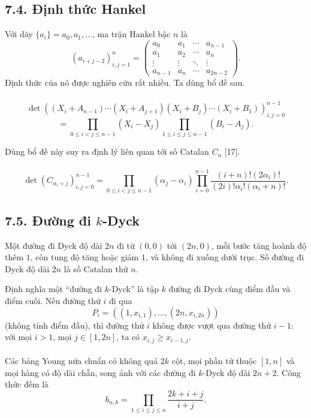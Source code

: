 \documentclass[11pt]{article}
\begin{document}
\subsection*{7.4. Định thức Hankel}

Với dãy \(\{a_i\}=a_0,a_1,\ldots\), ma trận Hankel bậc \(n\) là
\[
(a_{i+j-2})_{i,j=1}^n=
\begin{pmatrix}
a_0&a_1&\cdots&a_{n-1}\\
a_1&a_2&\cdots&a_n\\
\vdots&\vdots&\ddots&\vdots\\
a_{n-1}&a_n&\cdots&a_{2n-2}
\end{pmatrix}.
\]
Định thức của nó được nghiên cứu rất nhiều. Ta dùng bổ đề sau.

\paragraph{}
\[
\det\left(
(X_i+A_{n-1})\cdots(X_i+A_{j+1})
(X_i+B_j)\cdots(X_i+B_1)
\right)_{i,j=0}^{n-1}
\]
\[
=\prod_{0\le i<j\le n-1}(X_i-X_j)
\prod_{1\le i\le j\le n-1}(B_i-A_j).
\]

Dùng bổ đề này suy ra định lý liên quan tới số Catalan \(C_n\) [17].

\paragraph{}
\[
\det(C_{\alpha_i+j})_{i,j=0}^{n-1}
=
\prod_{0\le i<j\le n-1}(\alpha_j-\alpha_i)
\prod_{i=0}^{n-1}
\frac{(i+n)!(2\alpha_i)!}{(2i)!\alpha_i!(\alpha_i+n)!}.
\]

\subsection*{7.5. Đường đi \(k\)-Dyck}

Một đường đi Dyck độ dài \(2n\) đi từ \((0,0)\) tới \((2n,0)\), mỗi bước tăng
hoành độ thêm \(1\), còn tung độ tăng hoặc giảm \(1\), và không đi xuống dưới
trục. Số đường đi Dyck độ dài \(2n\) là số Catalan thứ \(n\).

Định nghĩa một ``đường đi \(k\)-Dyck'' là tập \(k\) đường đi Dyck cùng điểm
đầu và điểm cuối. Nếu đường thứ \(i\) đi qua
\[
P_i=((1,x_{i,1}),\ldots,(2n,x_{i,2n}))
\]
(không tính điểm đầu), thì đường thứ \(i\) không được vượt qua đường thứ
\(i-1\): với mọi \(i>1\), mọi \(j\in[1,2n]\), ta có
\(x_{i,j}\ge x_{i-1,j}\).

\paragraph{}
Các bảng Young nửa chuẩn có không quá \(2k\) cột, mọi phần tử thuộc \([1,n]\)
và mọi hàng có độ dài chẵn, song ánh với các đường đi \(k\)-Dyck độ dài
\(2n+2\). Công thức đếm là
\[
b_{n,k}=\prod_{1\le i\le j\le n}\frac{2k+i+j}{i+j}.
\]
\end{document}
